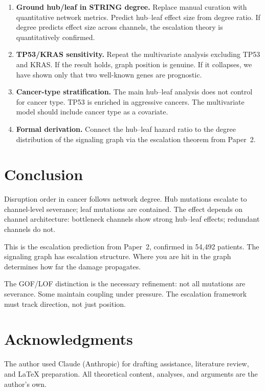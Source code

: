 \documentclass[11pt]{article}
\begin{document}
\begin{enumerate}
\item \textbf{Ground hub/leaf in STRING degree.} Replace manual
curation with quantitative network metrics. Predict hub--leaf
effect size from degree ratio. If degree predicts effect size
across channels, the escalation theory is quantitatively confirmed.
\item \textbf{TP53/KRAS sensitivity.} Repeat the multivariate
analysis excluding TP53 and KRAS. If the result holds, graph
position is genuine. If it collapses, we have shown only that
two well-known genes are prognostic.
\item \textbf{Cancer-type stratification.} The main hub--leaf
analysis does not control for cancer type. TP53 is enriched in
aggressive cancers. The multivariate model should include
cancer type as a covariate.
\item \textbf{Formal derivation.} Connect the hub--leaf hazard
ratio to the degree distribution of the signaling graph via the
escalation theorem from Paper~2.
\end{enumerate}

\section{Conclusion}
\label{sec:conclusion}

Disruption order in cancer follows network degree. Hub mutations
escalate to channel-level severance; leaf mutations are contained.
The effect depends on channel architecture: bottleneck channels
show strong hub--leaf effects; redundant channels do not.

This is the escalation prediction from Paper~2, confirmed in
54{,}492 patients. The signaling graph has escalation structure.
Where you are hit in the graph determines how far the damage
propagates.

The GOF/LOF distinction is the necessary refinement: not all
mutations are severance. Some maintain coupling under pressure.
The escalation framework must track direction, not just position.

\section*{Acknowledgments}

The author used Claude (Anthropic) for drafting assistance,
literature review, and \LaTeX{} preparation. All theoretical
content, analyses, and arguments are the author's own.
\end{document}
